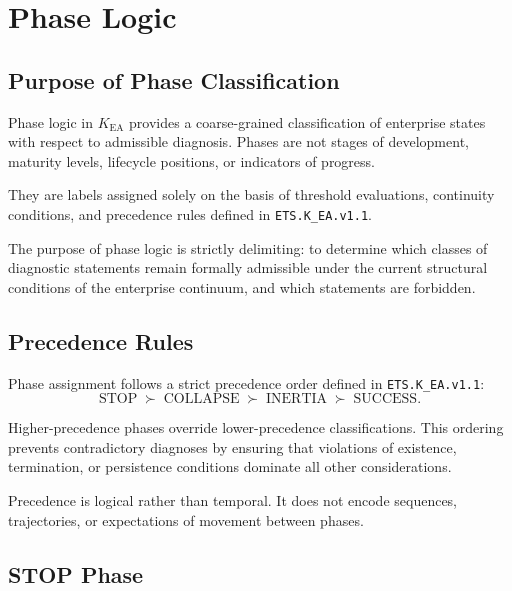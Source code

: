 
\section{Phase Logic}

\subsection{Purpose of Phase Classification}

Phase logic in $K_{\mathrm{EA}}$ provides a coarse-grained classification
of enterprise states with respect to admissible diagnosis.
Phases are not stages of development, maturity levels, lifecycle
positions, or indicators of progress.

They are labels assigned solely on the basis of threshold evaluations,
continuity conditions, and precedence rules defined in
\texttt{ETS.K\_EA.v1.1}.

The purpose of phase logic is strictly delimiting: to determine which
classes of diagnostic statements remain formally admissible under the
current structural conditions of the enterprise continuum, and which
statements are forbidden.

\subsection{Precedence Rules}

Phase assignment follows a strict precedence order defined in
\texttt{ETS.K\_EA.v1.1}:
\[
\text{STOP} \;\succ\; \text{COLLAPSE} \;\succ\; \text{INERTIA} \;\succ\;
\text{SUCCESS}.
\]

Higher-precedence phases override lower-precedence classifications.
This ordering prevents contradictory diagnoses by ensuring that
violations of existence, termination, or persistence conditions dominate
all other considerations.

Precedence is logical rather than temporal.
It does not encode sequences, trajectories, or expectations of movement
between phases.

\subsection{STOP Phase}


